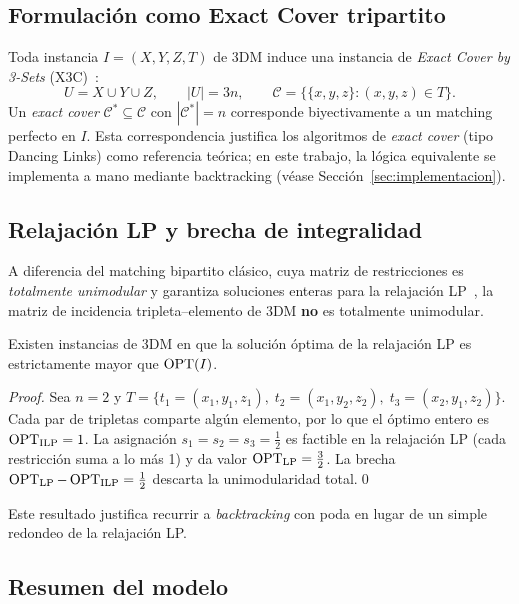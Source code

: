 \subsection{Formulación como Exact Cover tripartito}
\label{sec:modelo:x3c}

Toda instancia $I=(X,Y,Z,T)$ de 3DM induce una instancia de
\textit{Exact Cover by 3-Sets} (X3C)~\cite{garey1979}:
\[
U = X\cup Y\cup Z,\qquad |U|=3n,\qquad
\mathcal{C} = \bigl\{\{x,y,z\} : (x,y,z)\in T\bigr\}.
\]
Un \emph{exact cover} $\mathcal{C}^*\subseteq\mathcal{C}$ con $|\mathcal{C}^*|=n$
corresponde biyectivamente a un matching perfecto en $I$.
Esta correspondencia justifica los algoritmos de
\emph{exact cover} (tipo Dancing Links) como referencia teórica; en este
trabajo, la lógica equivalente se implementa a mano mediante backtracking
(véase Sección~\ref{sec:implementacion}).

\subsection{Relajación LP y brecha de integralidad}
\label{sec:modelo:lp}

A diferencia del matching bipartito clásico, cuya matriz de restricciones es
\emph{totalmente unimodular} y garantiza soluciones enteras para la relajación
LP~\cite{garey1979}, la matriz de incidencia tripleta--elemento de 3DM
\textbf{no} es totalmente unimodular.

\begin{lemma}
\label{lem:gap}
Existen instancias de 3DM en que la solución óptima de la relajación LP es
estrictamente mayor que $\operatorname{OPT}(I)$.
\end{lemma}
\begin{proof}
Sea $n=2$ y $T=\{t_1{=}(x_1,y_1,z_1),\;t_2{=}(x_1,y_2,z_2),\;t_3{=}(x_2,y_1,z_2)\}$.
Cada par de tripletas comparte algún elemento, por lo que el óptimo entero es
$\operatorname{OPT}_{\text{ILP}}=1$.
La asignación $s_1=s_2=s_3=\tfrac{1}{2}$ es factible en la relajación LP
(cada restricción suma a lo más 1) y da valor $\operatorname{OPT}_{\text{LP}}=\tfrac{3}{2}$.
La brecha $\operatorname{OPT}_{\text{LP}}-\operatorname{OPT}_{\text{ILP}}=\tfrac{1}{2}$ descarta la
unimodularidad total.\qed
\end{proof}

Este resultado justifica recurrir a \emph{backtracking} con poda en lugar de
un simple redondeo de la relajación LP.

\subsection{Resumen del modelo}
\label{sec:modelo:resumen}

